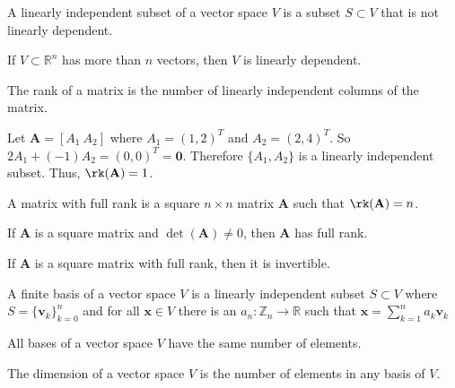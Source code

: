     \begin{definition}
        A linearly independent subset of a vector space
        $V$ is a subset ${S}\subset{V}$ that is not
        linearly dependent.
    \end{definition}
    \begin{theorem}
        If $V\subset\mathbb{R}^{n}$ has more than
        $n$ vectors, then $V$ is linearly dependent.
    \end{theorem}
    \begin{definition}
        The rank of a matrix is the number
        of linearly independent columns of
        the matrix.
    \end{definition}
    \begin{example}
        Let
        $\mathbf{A}=[A_{1}\ A_{2}]$
        where $A_{1}=(1,2)^{T}$ and
        $A_{2}=(2,4)^{T}$. So
        $2A_{1}+(-1)A_{2}=(0,0)^{T}=\mathbf{0}$. Therefore
        $\{A_{1},A_{2}\}$ is a linearly independent
        subset. Thus, $\rk(\mathbf{A})=1$.
    \end{example}
    \begin{definition}
        A matrix with full rank is a square
        ${n}\times{n}$ matrix $\mathbf{A}$ such that
        $\rk(\mathbf{A})=n$.
    \end{definition}
    \begin{theorem}
        If $\mathbf{A}$ is a square matrix and
        $\det(\mathbf{A})\ne{0}$, then $\mathbf{A}$
        has full rank.
    \end{theorem}
    \begin{theorem}
        If $\mathbf{A}$ is a square matrix with full rank, then it is
        invertible.
    \end{theorem}
    \begin{definition}
        A finite basis of a vector space $V$ is a
        linearly independent subset ${S}\subset{V}$
        where
        $S=\{\mathbf{v}_{k}\}_{k=0}^{n}$
        and for all
        $\mathbf{x}\in{V}$ there is an
        $a_{n}:\mathbb{Z}_{n}\rightarrow\mathbb{R}$
        such that
        $\mathbf{x}=\sum_{k=1}^{n}a_{k}\mathbf{v}_{k}$
    \end{definition}
    \begin{theorem}
        All bases of a vector space $V$ have the
        same number of elements.
    \end{theorem}
    \begin{definition}
        The dimension of a vector space $V$ is the number of elements in any
        basis of $V$.
    \end{definition}
